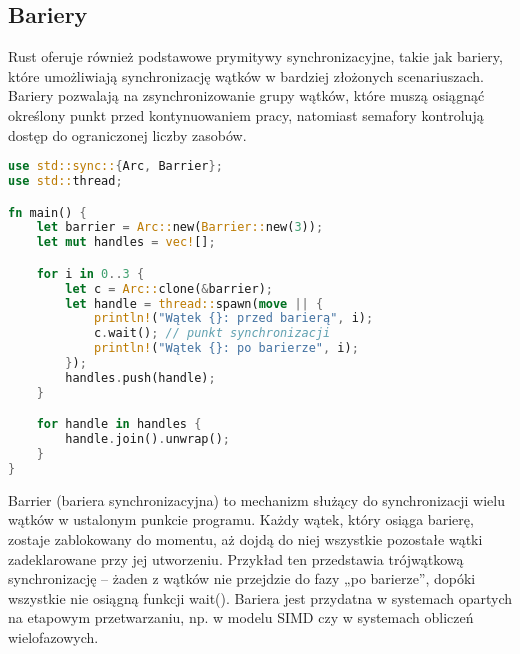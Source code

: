 \subsection{Bariery}
Rust oferuje również podstawowe prymitywy synchronizacyjne, takie jak bariery, które umożliwiają synchronizację wątków w bardziej złożonych scenariuszach. Bariery pozwalają na zsynchronizowanie grupy wątków, które muszą osiągnąć określony punkt przed kontynuowaniem pracy, natomiast semafory kontrolują dostęp do ograniczonej liczby zasobów.
\begin{lstlisting}[language=Rust, caption=Przykład użycia bariery, label=barrier_example]
use std::sync::{Arc, Barrier};
use std::thread;

fn main() {
    let barrier = Arc::new(Barrier::new(3));
    let mut handles = vec![];

    for i in 0..3 {
        let c = Arc::clone(&barrier);
        let handle = thread::spawn(move || {
            println!("Wątek {}: przed barierą", i);
            c.wait(); // punkt synchronizacji
            println!("Wątek {}: po barierze", i);
        });
        handles.push(handle);
    }

    for handle in handles {
        handle.join().unwrap();
    }
}
\end{lstlisting}
Barrier (bariera synchronizacyjna) to mechanizm służący do synchronizacji wielu wątków w ustalonym punkcie programu. Każdy wątek, który osiąga barierę, zostaje zablokowany do momentu, aż dojdą do niej wszystkie pozostałe wątki zadeklarowane przy jej utworzeniu. Przykład ten przedstawia trójwątkową synchronizację – żaden z wątków nie przejdzie do fazy „po barierze”, dopóki wszystkie nie osiągną funkcji wait(). Bariera jest przydatna w systemach opartych na etapowym przetwarzaniu, np. w modelu SIMD czy w systemach obliczeń wielofazowych.